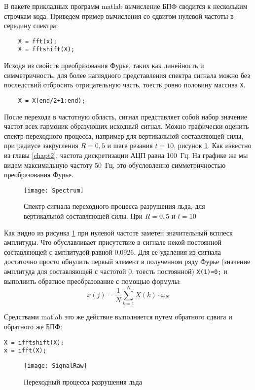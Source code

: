 В пакете прикладных программ matlab вычисление БПФ сводится к нескольким строчкам кода. Приведем пример вычисления со сдвигом нулевой частоты в середину спектра:
\begin{lstlisting}
	X = fft(x);
	X = fftshift(X);
\end{lstlisting}

Исходя из свойств преобразования Фурье, таких как линейность и симметричность, для более наглядного представления спектра сигнала можно без последствий отбросить отрицательную часть, тоесть ровно половину массива \verb|X|. 
\begin{lstlisting}
	X = X(end/2+1:end);
\end{lstlisting}

После перехода в частотную область, сигнал представляет собой набор значение частот всех гармоник образующих исходный сигнал. Можно графически оценить спектр переходного процесса, например для вертикальной составляющей силы, при радиусе закругления $ R=0,5 $ и шаге резания $ t=10 $, рисунок \ref{img:Spectrum}. Как известно из главы \ref{chapt2}, частота дискретизации АЦП равна 100~Гц. На графике же мы видем максимальную частоту 50~Гц, это обусловленно симметричностью преобразования Фурье. 
\begin{figure}[ht] 
	\center
	\texttt{[image: Spectrum]}
	\caption{Спектр сигнала переходного процесса разрушения льда, для вертикальной составляющей силы. При $ R=0,5 $ и $ t=10 $} 
	\label{img:Spectrum}  
\end{figure}

Как видно из рисунка \ref{img:Spectrum} при нулевой частоте заметен значительный всплеск амплитуды. Что обуславливает присутствие в сигнале некой постоянной составляющей с амплитудой равной 0,0926.  Для ее удаления из сигнала достаточно просто обнулить первый элемент в полученном ряду Фурье (значение амплитуда для составляющей с частотой 0, тоесть постоянной) \verb|X(1)=0;| и выполнить обратное преобразование с помощью формулы:
\begin{equation}\label{eq:iFFT}
x(j)=\frac{1}{N}\sum_{k=1}^{N} X(k)\cdot\omega_{N}
\end{equation}

Средствами matlab это же действие выполняется путем обратного сдвига и обратного же БПФ:
\begin{lstlisting}
X = ifftshift(X);
x = ifft(X);
\end{lstlisting}
\begin{figure}[ht] 
	\center
	\texttt{[image: SignalRaw]}
	\caption{Переходный процесса разрушения льда} 
	\label{img:SignalRaw}  
\end{figure}

